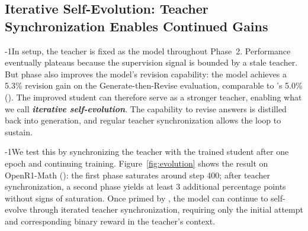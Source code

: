 



\subsection{Iterative Self-Evolution: Teacher Synchronization Enables Continued Gains}
\label{sec:self-evolution}



\looseness-1In \ours{} setup, the teacher is fixed as the \sft{} model throughout Phase~2. Performance eventually plateaus because the supervision signal is bounded by a stale teacher. But \opsd{} phase also improves the model's revision capability: the \ours{} model achieves a 5.3\% revision gain on the Generate-then-Revise evaluation, comparable to \sft{}'s 5.0\% (). 
The improved student can therefore serve as a stronger teacher, enabling what we call \textbf{\emph{iterative self-evolution}}. The capability to revise answers is distilled back into generation, and regular teacher synchronization allows the loop to sustain.

\looseness-1We test this by synchronizing the teacher with the trained student after one epoch and continuing training. Figure~\ref{fig:evolution} shows the result on OpenR1-Math (\qwen{}): the first \opsd{} phase saturates around step 400; after teacher synchronization, a second phase yields at least 3 additional percentage points without signs of saturation. Once primed by \sft{}, the model can continue to self-evolve through iterated teacher synchronization, requiring only the initial attempt and corresponding binary reward in the teacher's context.
